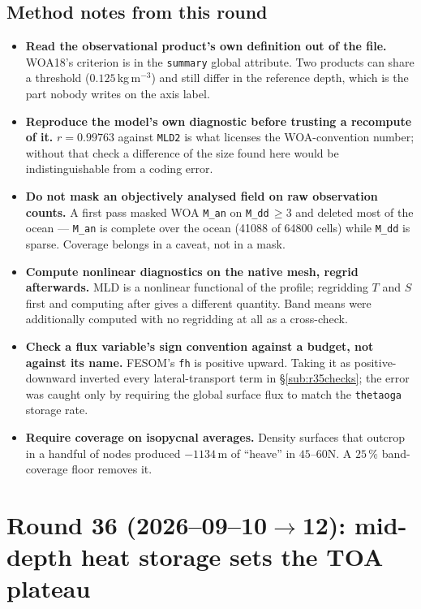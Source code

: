 \documentclass[10pt]{article}
\begin{document}
\subsection{Method notes from this round}\label{sub:r35method}
\begin{itemize}\itemsep2pt
\item \textbf{Read the observational product's own definition out of the file.} WOA18's
criterion is in the \texttt{summary} global attribute. Two products can share a threshold
($0.125$\,kg\,m$^{-3}$) and still differ in the reference depth, which is the part nobody
writes on the axis label.
\item \textbf{Reproduce the model's own diagnostic before trusting a recompute of it.}
$r=0.99763$ against \texttt{MLD2} is what licenses the WOA-convention number; without that
check a difference of the size found here would be indistinguishable from a coding error.
\item \textbf{Do not mask an objectively analysed field on raw observation counts.} A first
pass masked WOA \texttt{M\_an} on \texttt{M\_dd}\,$\ge3$ and deleted most of the ocean ---
\texttt{M\_an} is complete over the ocean (41088 of 64800 cells) while \texttt{M\_dd} is
sparse. Coverage belongs in a caveat, not in a mask.
\item \textbf{Compute nonlinear diagnostics on the native mesh, regrid afterwards.} MLD is a
nonlinear functional of the profile; regridding $T$ and $S$ first and computing after gives
a different quantity. Band means were additionally computed with no regridding at all as a
cross-check.
\item \textbf{Check a flux variable's sign convention against a budget, not against its
name.} FESOM's \texttt{fh} is positive upward. Taking it as positive-downward inverted
every lateral-transport term in \S\ref{sub:r35checks}; the error was caught only by
requiring the global surface flux to match the \texttt{thetaoga} storage rate.
\item \textbf{Require coverage on isopycnal averages.} Density surfaces that outcrop in a
handful of nodes produced $-1134$\,m of ``heave'' in $45$--$60$N. A $25\,\%$ band-coverage
floor removes it.
\end{itemize}

\section{Round 36 (2026--09--10$\to$12): mid-depth heat storage sets the TOA plateau}\label{sec:round36}
\end{document}
